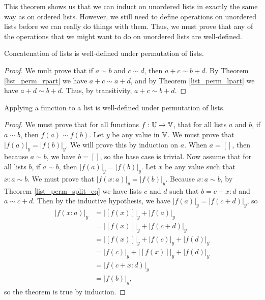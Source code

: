 \documentclass[../../math.tex]{subfiles}
\begin{document}
This theorem shows us that we can induct on unordered lists in exactly the same
way as on ordered lists.  However, we still need to define operations on
unordered lists before we can really do things with them.  Thus, we must prove
that any of the operations that we might want to do on unordered lists are
well-defined.

\begin{lemma}
    Concatenation of lists is well-defined under permutation of lists.
\end{lemma}
\begin{proof}
    We mult prove that if $a \sim b$ and $c \sim d$, then $a + c \sim b + d$.
    By Theorem \ref{list_perm_rpart} we have $a + c \sim a + d$, and by Theorem
    \ref{list_perm_lpart} we have $a + d \sim b + d$.  Thus, by transitivity, $a
    + c \sim b + d$.
\end{proof}

\begin{lemma}
    Applying a function to a list is well-defined under permutation of lists.
\end{lemma}
\begin{proof}
    We must prove that for all functions $f : \mathbb{U} \to \mathbb{V}$, that for all lists $a$
    and $b$, if $a \sim b$, then $f(a) \sim f(b)$.  Let $y$ be any value in
    $\mathbb{V}$.  We must prove that $|f(a)|_y = |f(b)|_y$.  We will prove this by
    induction on $a$.  When $a = []$, then because $a \sim b$, we have $b = []$,
    so the base case is trivial.  Now assume that for all lists $b$, if $a \sim
    b$, then $|f(a)|_y = |f(b)|_y$.  Let $x$ be any value such that $x : a \sim
    b$.  We must prove that $|f(x : a)|_y = |f(b)|_y$.  Because $x : a \sim b$,
    by Theorem \ref{list_perm_split_eq} we have lists $c$ and $d$ such that $b =
    c + x : d$ and $a \sim c + d$.  Then by the inductive hypothesis, we have
    $|f(a)|_y = |f(c + d)|_y$, so
    \begin{align*}
        |f(x : a)|_y
        &= |[f(x)]|_y + |f(a)|_y \\
        &= |[f(x)]|_y + |f(c + d)|_y \\
        &= |[f(x)]|_y + |f(c)|_y + |f(d)|_y \\
        &= |f(c)|_y + |[f(x)]|_y + |f(d)|_y \\
        &= |f(c + x : d)|_y \\
        &= |f(b)|_y,
    \end{align*}
    so the theorem is true by induction.
\end{proof}
\end{document}
